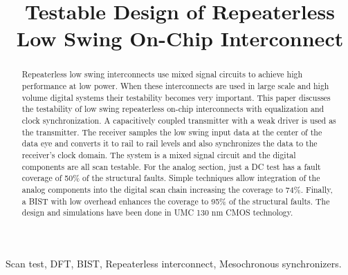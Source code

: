 \documentclass[conference]{IEEEtran}
\begin{document}
\title{Testable Design of Repeaterless Low Swing On-Chip Interconnect}



\author{
}

\maketitle


\begin{abstract}
Repeaterless low swing interconnects use mixed signal circuits to achieve 
high performance at low power. When these interconnects are used in
large scale and high volume digital systems their testability 
becomes very important. This paper discusses 
the testability of low swing repeaterless 
on-chip interconnects with equalization and clock synchronization. 
A capacitively coupled transmitter with a weak
driver is used as the transmitter. The receiver samples the low swing 
input data at the center of the data eye and converts it to 
rail to rail levels and also synchronizes the data
to the receiver's clock domain. The system is a mixed signal circuit
and the digital components are all scan testable. For the analog
section, just a DC test has a fault coverage of 50\% of the structural 
faults. Simple techniques allow integration of the analog components
into the digital scan chain increasing the coverage to 74\%. Finally,
a BIST with low overhead enhances the coverage to 95\% of the structural faults.
The design and simulations have been done in UMC 130 nm CMOS technology.
\end{abstract}


\begin{IEEEkeywords}
Scan test, DFT, BIST, Repeaterless interconnect,
Mesochronous synchronizers.
\end{IEEEkeywords}
\end{document}
